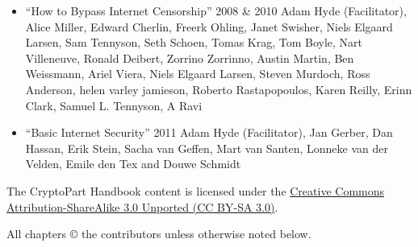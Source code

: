 \begin{itemize}
\item
  ``How to Bypass Internet Censorship'' 2008 \& 2010 Adam Hyde
  (Facilitator), Alice Miller, Edward Cherlin, Freerk Ohling, Janet
  Swisher, Niels Elgaard Larsen, Sam Tennyson, Seth Schoen, Tomas Krag,
  Tom Boyle, Nart Villeneuve, Ronald Deibert, Zorrino Zorrinno, Austin
  Martin, Ben Weissmann, Ariel Viera, Niels Elgaard Larsen, Steven
  Murdoch, Ross Anderson, helen varley jamieson, Roberto Rastapopoulos,
  Karen Reilly, Erinn Clark, Samuel L. Tennyson, A Ravi
\item
  ``Basic Internet Security'' 2011 Adam Hyde (Facilitator), Jan Gerber,
  Dan Hassan, Erik Stein, Sacha van Geffen, Mart van Santen, Lonneke van
  der Velden, Emile den Tex and Douwe Schmidt
\end{itemize}
The CryptoPart Handbook content is licensed under the
\href{https://creativecommons.org/licenses/by-sa/3.0/}{Creative Commons
Attribution-ShareAlike 3.0 Unported (CC BY-SA 3.0)}.

All chapters © the contributors unless otherwise noted below.
